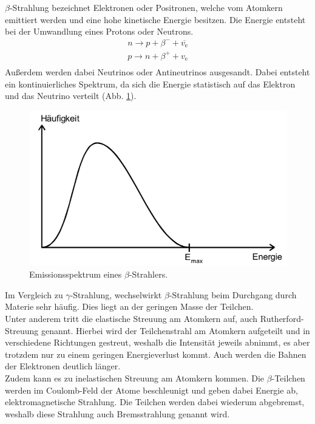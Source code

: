 $\beta$-Strahlung bezeichnet Elektronen oder Positronen, welche vom Atomkern emittiert werden und eine hohe kinetische Energie besitzen. Die Energie entsteht bei der Umwandlung eines Protons oder Neutrons.
\begin{gather*}
	n \rightarrow p + \beta^{-} + \overline{v_\text{e}} \\
	p \rightarrow n + \beta^{+} + v_\text{e} \\
\end{gather*}
Außerdem werden dabei Neutrinos oder Antineutrinos ausgesandt. Dabei entsteht ein kontinuierliches Spektrum, da sich die Energie statistisch auf das Elektron und das Neutrino verteilt (Abb. \ref{fig:VerteilungBeta}).
\begin{figure}[H]
    \centering
    \includegraphics[scale=0.7]{Theorie/VerteilungBeta.pdf}
    \caption{Emissionsspektrum eines $\beta$-Strahlers.}
    \label{fig:VerteilungBeta}
\end{figure}
Im Vergleich zu $\gamma$-Strahlung, wechselwirkt $\beta$-Strahlung beim Durchgang durch Materie sehr häufig. Dies liegt an der geringen Masse der Teilchen.\\
Unter anderem tritt die elastische Streuung am Atomkern auf, auch Rutherford-Streuung genannt. Hierbei wird der Teilchenstrahl am Atomkern aufgeteilt und in verschiedene Richtungen gestreut, weshalb die Intensität jeweils abnimmt, es aber trotzdem nur zu einem geringen Energieverlust kommt. Auch werden die Bahnen der Elektronen deutlich länger. \\
Zudem kann es zu inelastischen Streuung am Atomkern kommen. Die $\beta$-Teilchen werden im Coulomb-Feld der Atome beschleunigt und geben dabei Energie ab, elektromagnetische Strahlung. Die Teilchen werden dabei wiederum abgebremst, weshalb diese Strahlung auch Bremsstrahlung genannt wird.\\
